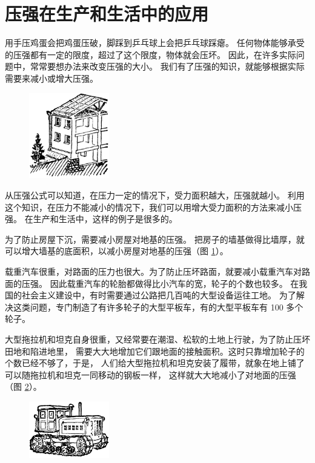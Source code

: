 \section{压强在生产和生活中的应用}\label{sec:5-2}

用手压鸡蛋会把鸡蛋压破，脚踩到乒乓球上会把乒乓球踩瘪。
任何物体能够承受的压强都有一定的限度，超过了这个限度，物体就会压坏。
因此，在许多实际问题中，常常要想办法来改变压强的大小。
我们有了压强的知识，就能够根据实际需要来减小或增大压强。

\begin{figure}
    \centering
    \includegraphics[width=3.5cm]{../pic/czwl1-ch5-4}
    \caption{}\label{fig:5-4}
\end{figure}

从压强公式可以知道，在压力一定的情况下，受力面积越大，压强就越小。
利用这个知识，在压力不能减小的情况下，我们可以用增大受力面积的方法来减小压强。
在生产和生活中，这样的例子是很多的。

为了防止房屋下沉，需要减小房屋对地基的压强。
把房子的墙基做得比墙厚，就可以增大墙基的底面积，以减小房屋对地基的压强（图 \ref{fig:5-4}）。

载重汽车很重，对路面的压力也很大。为了防止压坏路面，就要减小载重汽车对路面的压强。
因此载重汽车的轮胎都做得比小汽车的宽，轮子的个数也较多。
在我国的社会主义建设中，有时需要通过公路把几百吨的大型设备运往工地。
为了解决这类问题，专门制造了有许多轮子的大型平板车，有的大型平板车有 100 多个轮子。

大型拖拉机和坦克自身很重，又经常要在潮湿、松软的土地上行驶，为了防止压坏田地和陷进地里，
需要大大地增加它们跟地面的接触面积。这时只靠增加轮子的个数已经不够了，于是，
人们给大型拖拉机和坦克安装了履带，就象在地上铺了可以随拖拉机和坦克一同移动的钢板一样，
这样就大大地减小了对地面的压强（图 \ref{fig:5-5}）。

\begin{figure}
    \centering
    \includegraphics[width=3.5cm]{../pic/czwl1-ch5-5}
    \caption{}\label{fig:5-5}
\end{figure}

